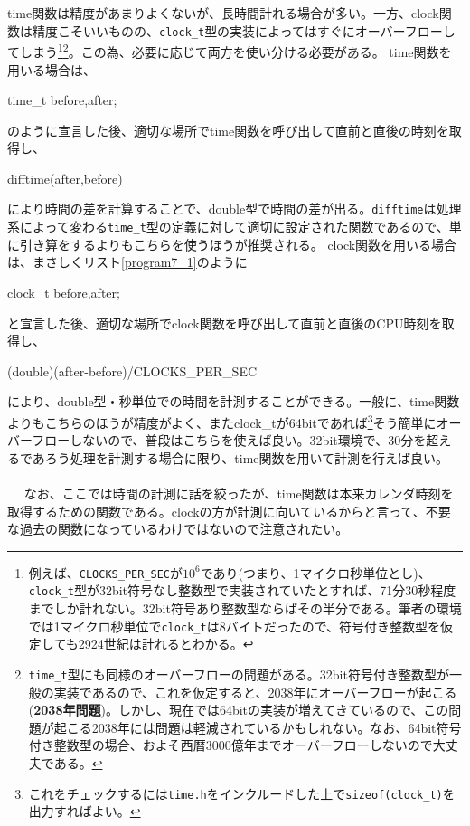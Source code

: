 time関数は精度があまりよくないが、長時間計れる場合が多い。一方、clock関数は精度こそいいものの、\verb|clock_t|型の実装によってはすぐにオーバーフローしてしまう\footnote{例えば、\verb|CLOCKS_PER_SEC|が$10^6$であり(つまり、1マイクロ秒単位とし)、\verb|clock_t|型が32bit符号なし整数型で実装されていたとすれば、71分30秒程度までしか計れない。32bit符号あり整数型ならばその半分である。筆者の環境では1マイクロ秒単位で\verb|clock_t|は8バイトだったので、符号付き整数型を仮定しても2924世紀は計れるとわかる。}\footnote{\verb|time_t|型にも同様のオーバーフローの問題がある。32bit符号付き整数型が一般の実装であるので、これを仮定すると、2038年にオーバーフローが起こる(\textbf{2038年問題})。しかし、現在では64bitの実装が増えてきているので、この問題が起こる2038年には問題は軽減されているかもしれない。なお、64bit符号付き整数型の場合、およそ西暦3000億年までオーバーフローしないので大丈夫である。}。この為、必要に応じて両方を使い分ける必要がある。
time関数を用いる場合は、
\begin{code}
time_t before,after;
\end{code}
のように宣言した後、適切な場所でtime関数を呼び出して直前と直後の時刻を取得し、
\begin{code}
difftime(after,before)
\end{code}
により時間の差を計算することで、double型で時間の差が出る。\verb|difftime|は処理系によって変わる\verb|time_t|型の定義に対して適切に設定された関数であるので、単に引き算をするよりもこちらを使うほうが推奨される。
clock関数を用いる場合は、まさしくリスト\ref{program7_1}のように
\begin{code}
clock_t before,after;
\end{code}
と宣言した後、適切な場所でclock関数を呼び出して直前と直後のCPU時刻を取得し、
\begin{code}
(double)(after-before)/CLOCKS_PER_SEC
\end{code}
により、double型・秒単位での時間を計測することができる。一般に、time関数よりもこちらのほうが精度がよく、またclock\_tが64bitであれば\footnote{これをチェックするには\verb|time.h|をインクルードした上で\verb|sizeof(clock_t)|を出力すればよい。}そう簡単にオーバーフローしないので、普段はこちらを使えば良い。32bit環境で、30分を超えるであろう処理を計測する場合に限り、time関数を用いて計測を行えば良い。
\\ \\　
なお、ここでは時間の計測に話を絞ったが、time関数は本来カレンダ時刻を取得するための関数である。clockの方が計測に向いているからと言って、不要な過去の関数になっているわけではないので注意されたい。

